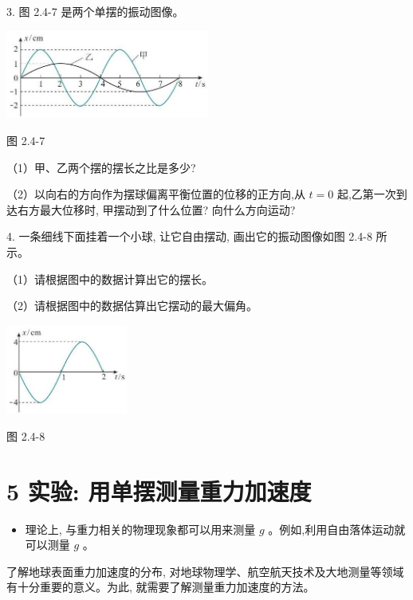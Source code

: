 \documentclass[10pt]{article}
\begin{document}
3. 图 2.4-7 是两个单摆的振动图像。

\begin{center}
\includegraphics[max width=0.5\textwidth]{images/01910e4c-ebb8-7d2c-8f2f-2375bc1d2d12_55_266789.jpg}
\end{center}

图 2.4-7

（1）甲、乙两个摆的摆长之比是多少?

（2）以向右的方向作为摆球偏离平衡位置的位移的正方向,从 \(t = 0\) 起,乙第一次到达右方最大位移时, 甲摆动到了什么位置? 向什么方向运动?

4. 一条细线下面挂着一个小球, 让它自由摆动, 画出它的振动图像如图 2.4-8 所示。

（1）请根据图中的数据计算出它的摆长。

（2）请根据图中的数据估算出它摆动的最大偏角。

\begin{center}
\includegraphics[max width=0.3\textwidth]{images/01910e4c-ebb8-7d2c-8f2f-2375bc1d2d12_55_956372.jpg}
\end{center}

图 2.4-8

\section*{5 实验: 用单摆测量重力加速度}

\begin{mdframed}

\begin{itemize}
\item 理论上, 与重力相关的物理现象都可以用来测量 \(g\) 。例如,利用自由落体运动就可以测量 \(g\) 。
\end{itemize}

\end{mdframed}

了解地球表面重力加速度的分布, 对地球物理学、航空航天技术及大地测量等领域有十分重要的意义。为此, 就需要了解测量重力加速度的方法。
\end{document}
